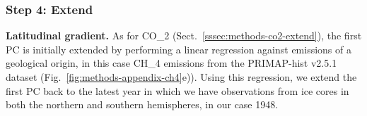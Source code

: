 \subsubsection{Step 4: Extend}
\label{sssec:methods-ch4-extend}

\textbf{Latitudinal gradient.}
As for CO_2 (Sect.~\ref{sssec:methods-co2-extend}),
the first PC is initially extended by performing a linear regression against emissions of a geological origin,
in this case CH_4 emissions from the PRIMAP-hist v2.5.1 dataset \citep{gutschow_primap-hist-dataset_2024,gutschow_primap-hist_2016} (Fig.~\ref{fig:methods-appendix-ch4}e)).
Using this regression, we extend the first PC back to the latest year
in which we have observations from ice cores in both the northern and southern hemispheres, in our case 1948.

